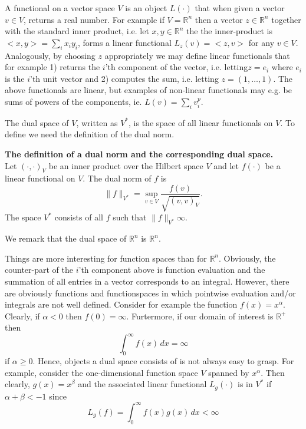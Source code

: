 A functional on a vector space $V$ is an object $L(\cdot)$ that when given a
vector $v\in V$, returns a real number. 
For example if $V=\mathbb{R}^n$ then a vector $z\in \mathbb{R}^n$ together
with the standard inner product,  i.e. let $x, y \in \mathbb{R}^n$
the the inner-product is $<x, y> = \sum_i x_i y_i$, forms a linear functional
$L_z(v)  = <z, v>$ for any $v\in V$. 
Analogously, by choosing $z$ appropriately we may define linear functionals
that for example 1) returns the $i$'th component of the vector, i.e. letting$z=e_i$ where
$e_i$ is the $i$'th unit vector and 2) computes the sum, i.e. letting $z=(1,\ldots, 1)$. 
The above functionals are linear, but examples of non-linear functionals may e.g. be
sums of powers of the components, ie.  $L(v) = \sum_i v_i^p$. 

The dual space of $V$, written as $V^*$,  is the space of all linear functionals on $V$. 
To define we need the definition of the dual norm. 

\begin{defin}{\textbf{The definition of a dual norm and the corresponding dual space.}} \\
\label{dualnorm}
Let $(\cdot, \cdot)_V$ be an inner product over the Hilbert
space $V$ and let $f(\cdot)$ be a linear functional on $V$.   
The dual norm of $f$ is 
\[
	\|f\|_{V^*} = \sup_{v\in V} \frac{f(v)}{\sqrt{(v,v)_V}} .    
\]
The space $V^*$ consists of all $f$ such that $\|f\|_{V^*} \infty$.  
\end{defin}
We remark that the dual space of $\mathbb{R}^n$ is $\mathbb{R}^n$.  

Things are more interesting for function spaces than for $\mathbb{R}^n$.  
Obviously, the counter-part of the $i$'th component above is function evaluation 
and the summation of all entries in a vector corresponds to an integral. However, 
there are obviously functions and functionspaces in which pointwise evaluation 
and/or integrals are not well defined. Consider for example the
function $f(x) = x^\alpha$. Clearly, if $\alpha < 0$ then $f(0) = \infty$. Furtermore, 
if our domain of interest is $\mathbb{R}^+$ then
\[
\int_0^\infty f(x) \, dx = \infty 
\]
if $\alpha \ge 0$. Hence, objects a dual space consists of is not always easy to grasp. 
For example, 
consider the one-dimensional function space $V$ spanned by  $x^\alpha$.  
Then clearly, $g(x) = x^\beta$ and the associated  
linear functional $L_g(\cdot)$ is in $V^*$ if $\alpha + \beta < -1$ since
\[
L_g(f) = \int_0^\infty f(x) g(x) \, dx   < \infty  
\]


